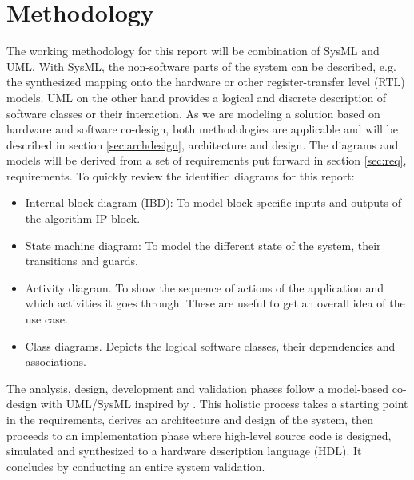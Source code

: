 \section{Methodology}

The working methodology for this report will be combination of SysML and UML. With SysML, the non-software parts of the system can be described, e.g. the synthesized mapping onto the hardware or other register-transfer level (RTL) models. UML on the other hand provides a logical and discrete description of software classes or their interaction. As we are modeling a solution based on hardware and software co-design, both methodologies are applicable and will be described in section \ref{sec:archdesign}, architecture and design. The diagrams and models will be derived from a set of requirements put forward in section \ref{sec:req}, requirements. To quickly review the identified diagrams for this report:

\begin{itemize}
	\item Internal block diagram (IBD): To model block-specific inputs and outputs of the algorithm IP block.
	\item State machine diagram: To model the different state of the system, their transitions and guards.
	\item Activity diagram. To show the sequence of actions of the application and which activities it goes through. These are useful to get an overall idea of the use case.
	\item Class diagrams. Depicts the logical software classes, their dependencies and associations.
\end{itemize}

The analysis, design, development and validation phases follow a model-based co-design with UML/SysML inspired by \cite{codesign}. This holistic process takes a starting point in the requirements, derives an architecture and design of the system, then proceeds to an implementation phase where high-level source code is designed, simulated and synthesized to a hardware description language (HDL). It concludes by conducting an entire system validation.
